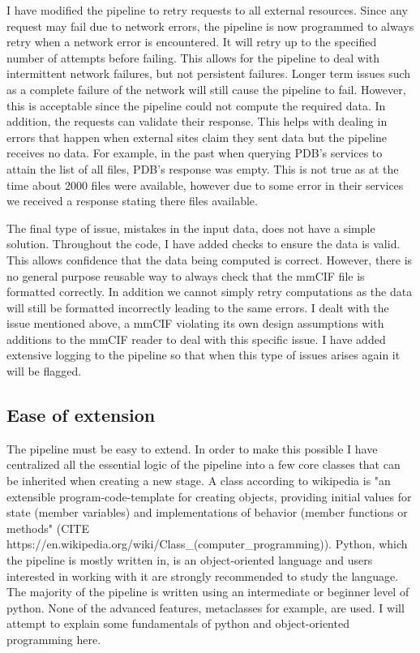 I have modified the pipeline to retry requests to all external resources. Since
any request may fail due to network errors, the pipeline is now programmed to
always retry when a network error is encountered. It will retry up to the
specified number of attempts before failing. This allows for the pipeline to
deal with intermittent network failures, but not persistent failures. Longer
term issues such as a complete failure of the network will still cause the
pipeline to fail. However, this is acceptable since the pipeline could not
compute the required data. In addition, the requests can validate their
response. This helps with dealing in errors that happen when external sites
claim they sent data but the pipeline receives no data. For example, in the past
when querying PDB's services to attain the list of all files, PDB's response was
empty. This is not true as at the time about 2000 files were available, however
due to some error in their services we received a response stating there files
available.

The final type of issue, mistakes in the input data, does not have a simple
solution. Throughout the code, I have added checks to ensure the data is valid.
This allows confidence that the data being computed is correct. However, there
is no general purpose reusable way to always check that the mmCIF file is
formatted correctly. In addition we cannot simply retry computations as the data
will still be formatted incorrectly leading to the same errors. I dealt with the
issue mentioned above, a mmCIF violating its own design assumptions with
additions to the mmCIF reader to deal with this specific issue. I have added
extensive logging to the pipeline so that when this type of issues arises again
it will be flagged.

\subsection{Ease of extension}

The pipeline must be easy to extend. In order to make this possible I have
centralized all the essential logic of the pipeline into a few core classes that
can be inherited when creating a new stage. A class according to wikipedia is
"an extensible program-code-template for creating objects, providing initial
values for state (member variables) and implementations of behavior (member
functions or methods" (CITE
https://en.wikipedia.org/wiki/Class\_(computer\_programming)). Python, which the
pipeline is mostly written in, is an object-oriented language and users
interested in working with it are strongly recommended to study the language.
The majority of the pipeline is written using an intermediate or beginner level
of python. None of the advanced features, metaclasses for example, are used. I
will attempt to explain some fundamentals of python and object-oriented
programming here.

